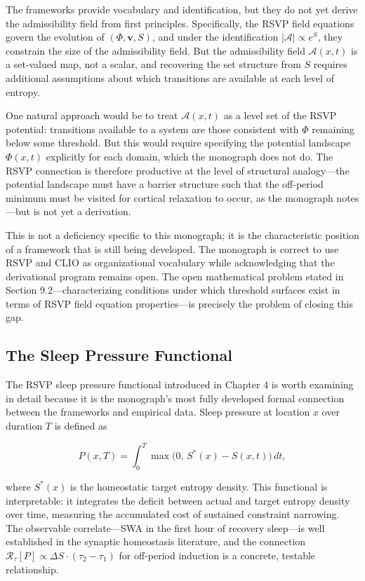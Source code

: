 \documentclass[12pt, a4paper]{article}
\theoremstyle{definition}
\begin{document}
The frameworks provide vocabulary and identification, but they do not yet derive the admissibility field from first principles. Specifically, the RSVP field equations govern the evolution of $(\Phi, \mathbf{v}, S)$, and under the identification $|\mathcal{A}| \propto e^S$, they constrain the size of the admissibility field. But the admissibility field $\mathcal{A}(x,t)$ is a set-valued map, not a scalar, and recovering the set structure from $S$ requires additional assumptions about which transitions are available at each level of entropy.

One natural approach would be to treat $\mathcal{A}(x,t)$ as a level set of the RSVP potential: transitions available to a system are those consistent with $\Phi$ remaining below some threshold. But this would require specifying the potential landscape $\Phi(x,t)$ explicitly for each domain, which the monograph does not do. The RSVP connection is therefore productive at the level of structural analogy---the potential landscape must have a barrier structure such that the off-period minimum must be visited for cortical relaxation to occur, as the monograph notes---but is not yet a derivation.

This is not a deficiency specific to this monograph; it is the characteristic position of a framework that is still being developed. The monograph is correct to use RSVP and CLIO as organizational vocabulary while acknowledging that the derivational program remains open. The open mathematical problem stated in Section 9.2---characterizing conditions under which threshold surfaces exist in terms of RSVP field equation properties---is precisely the problem of closing this gap.

\subsection{The Sleep Pressure Functional}

The RSVP sleep pressure functional introduced in Chapter 4 is worth examining in detail because it is the monograph's most fully developed formal connection between the frameworks and empirical data. Sleep pressure at location $x$ over duration $T$ is defined as

\begin{equation}
P(x, T) = \int_0^T \max\!\bigl(0,\, S^*(x) - S(x,t)\bigr)\, dt,
\end{equation}

where $S^*(x)$ is the homeostatic target entropy density. This functional is interpretable: it integrates the deficit between actual and target entropy density over time, measuring the accumulated cost of sustained constraint narrowing. The observable correlate---SWA in the first hour of recovery sleep---is well established in the synaptic homeostasis literature, and the connection $\mathcal{R}_\tau[P] \propto \Delta S \cdot (\tau_2 - \tau_1)$ for off-period induction is a concrete, testable relationship.
\end{document}
